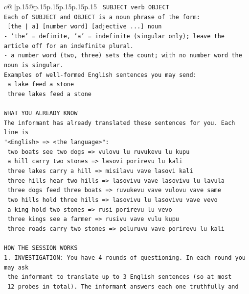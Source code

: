 \documentclass{article}
\begin{document}
{\begin{supertabular}{c@{$\;$}|p{.15\linewidth}@{}p{.15\linewidth}p{.15\linewidth}p{.15\linewidth}p{.15\linewidth}p{.15\linewidth}}
{{{\texttt{    SUBJECT  verb  OBJECT} \\
\texttt{Each of SUBJECT and OBJECT is a noun phrase of the form:} \\
\texttt{    {[}the | a{]}  {[}number word{]}  {[}adjective ...{]}  noun} \\
\texttt{{-} 'the' = definite, 'a' = indefinite (singular only); leave the article off for an indefinite plural.} \\
\texttt{{-} a number word (two, three) sets the count; with no number word the noun is singular.} \\
\texttt{Examples of well{-}formed English sentences you may send:} \\
\texttt{    a lake feed a stone} \\
\texttt{    three lakes feed a stone} \\
\\ 
\texttt{WHAT YOU ALREADY KNOW} \\
\texttt{The informant has already translated these sentences for you. Each line is} \\
\texttt{"<English>  =>  <the language>":} \\
\texttt{    two boats see two dogs  =>  vulovu lu ruvukevu lu kupu} \\
\texttt{    a hill carry two stones  =>  lasovi porirevu lu kali} \\
\texttt{    three lakes carry a hill  =>  misilavu vave lasovi kali} \\
\texttt{    three hills hear two hills  =>  lasovivu vave lasovivu lu lavula} \\
\texttt{    three dogs feed three boats  =>  ruvukevu vave vulovu vave same} \\
\texttt{    two hills hold three hills  =>  lasovivu lu lasovivu vave vevo} \\
\texttt{    a king hold two stones  =>  rusi porirevu lu vevo} \\
\texttt{    three kings see a farmer  =>  rusivu vave vulu kupu} \\
\texttt{    three roads carry two stones  =>  peluruvu vave porirevu lu kali} \\
\\ 
\texttt{HOW THE SESSION WORKS} \\
\texttt{1. INVESTIGATION: You have 4 rounds of questioning. In each round you may ask} \\
\texttt{   the informant to translate up to 3 English sentences (so at most} \\
\texttt{   12 probes in total). The informant answers each one truthfully and} \\
}}}
\end{supertabular}}
\end{document}
